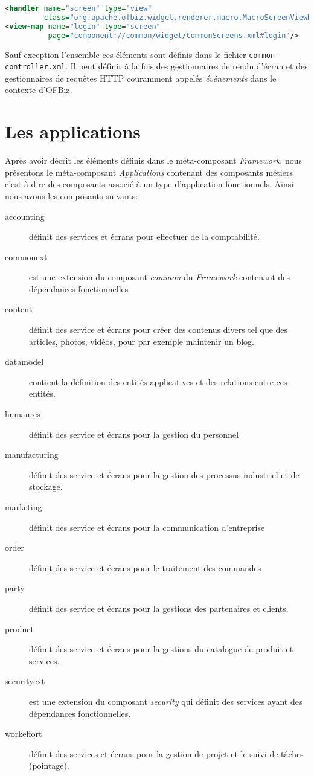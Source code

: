 \documentclass[a4paper, 11pt]{report}
\begin{document}
\begin{lstlisting}[language=xml]
<handler name="screen" type="view"
         class="org.apache.ofbiz.widget.renderer.macro.MacroScreenViewHandler"/>
<view-map name="login" type="screen"
          page="component://common/widget/CommonScreens.xml#login"/>
\end{lstlisting}

Sauf exception l'ensemble ces éléments sont définis dans le fichier
\verb=common-controller.xml=.  Il peut définir à la fois des
gestionnaires de rendu d'écran et des gestionnaires de requêtes HTTP
couramment appelés \emph{événements} dans le contexte d'OFBiz.

\section{Les applications}

Après avoir décrit les éléments définis dans le méta-composant
\emph{Framework}, nous présentons le méta-composant
\emph{Applications} contenant des composants métiers c'est à dire des
composants associé à un type d'application fonctionnels.  Ainsi nous
avons les composants suivants:

\begin{description}
\item[accounting] définit des services et écrans pour effectuer de la
  comptabilité.
\item[commonext] est une extension du composant \emph{common} du
  \emph{Framework} contenant des dépendances fonctionnelles
\item[content] définit des service et écrans pour créer des contenus
  divers tel que des articles, photos, vidéos, pour par exemple
  maintenir un blog.
\item[datamodel] contient la définition des entités
  applicatives et des relations entre ces entités.
\item[humanres] définit des service et écrans pour la gestion du
  personnel
\item[manufacturing] définit des service et écrans pour la gestion des
  processus industriel et de stockage.
\item[marketing] définit des service et écrans pour la communication
  d'entreprise
\item[order] définit des service et écrans pour le traitement des commandes
\item[party] définit des service et écrans pour la gestions des
  partenaires et clients.
\item[product] définit des service et écrans pour la gestions du
  catalogue de produit et services.
\item[securityext] est une extension du composant \emph{security} qui
  définit des services ayant des dépendances fonctionnelles.
\item[workeffort] définit des services et écrans pour la gestion de
  projet et le suivi de tâches (pointage).
\end{description}
\end{document}
